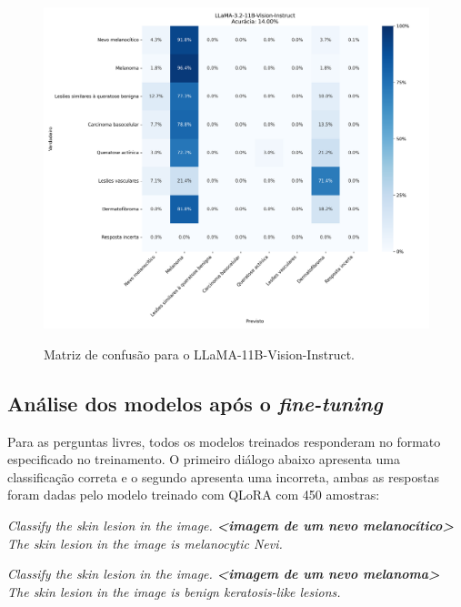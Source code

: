 \clearpage

\begin{figure}[ht]
    \centering
    \caption{\small Matriz de confusão para o \ac{LLaMA}-11B-Vision-Instruct.}
    \includegraphics[width=1\columnwidth,keepaspectratio]{images/confusion_matrix_llama_3.2_11b_vision_instruct.png}
    \label{fig:confusion_matrix_llama}
\end{figure}

\subsection{Análise dos modelos após o \textit{fine-tuning}}

Para as perguntas livres, todos os modelos treinados responderam no formato especificado no treinamento. O primeiro
diálogo abaixo apresenta uma classificação correta e o segundo apresenta uma incorreta, ambas as respostas foram dadas
pelo modelo treinado com \ac{QLoRA} com 450 amostras:

\begin{dialogue}
     \textit{Classify the skin lesion in the image. \textbf{<imagem de um nevo melanocítico>}} \\
     \textit{The skin lesion in the image is melanocytic Nevi.}
\end{dialogue}

\begin{dialogue}
     \textit{Classify the skin lesion in the image. \textbf{<imagem de um nevo melanoma>}} \\
     \textit{The skin lesion in the image is benign keratosis-like lesions.}
\end{dialogue}

